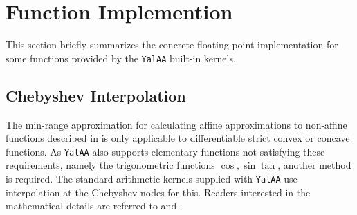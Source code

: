 \documentclass[a4]{scrartcl}
\newcommand{\yalaa}{\texttt{YalAA}\xspace}
\begin{document}

\appendix

\section{Function Implemention}
\label{sec:funct-impl}
This section briefly summarizes the concrete floating-point implementation for
some functions provided by the \yalaa built-in kernels.
\subsection{Chebyshev Interpolation}
\label{sec:chebysh-interp}
The min-range approximation for calculating affine approximations to
non-affine functions described in \cite{stolfi1997} is only applicable to
differentiable strict convex or concave functions. As \yalaa also supports
elementary functions not satisfying these requirements, namely the
trigonometric functions $\cos, \sin \tan$, another method is required. The
standard arithmetic kernels supplied with \yalaa use interpolation at the
Chebyshev nodes for this. Readers interested in the mathematical details
are referred to \cite{kearfott2010} and \cite{mason2003}.
\end{document}
